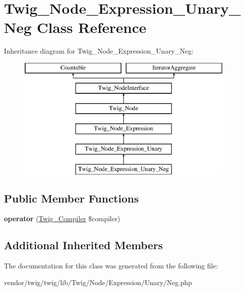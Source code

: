 \hypertarget{classTwig__Node__Expression__Unary__Neg}{}\section{Twig\+\_\+\+Node\+\_\+\+Expression\+\_\+\+Unary\+\_\+\+Neg Class Reference}
\label{classTwig__Node__Expression__Unary__Neg}
Inheritance diagram for Twig\+\_\+\+Node\+\_\+\+Expression\+\_\+\+Unary\+\_\+\+Neg\+:\begin{figure}[H]
\begin{center}
\leavevmode
\includegraphics[height=6.000000cm]{classTwig__Node__Expression__Unary__Neg}
\end{center}
\end{figure}
\subsection*{Public Member Functions}
\begin{DoxyCompactItemize}
\item 
{\bfseries operator} (\hyperlink{classTwig__Compiler}{Twig\+\_\+\+Compiler} \$compiler)\hypertarget{classTwig__Node__Expression__Unary__Neg_abf234515b049d5c6553ff7247bea40ab}{}\label{classTwig__Node__Expression__Unary__Neg_abf234515b049d5c6553ff7247bea40ab}

\end{DoxyCompactItemize}
\subsection*{Additional Inherited Members}


The documentation for this class was generated from the following file\+:\begin{DoxyCompactItemize}
\item 
vendor/twig/twig/lib/\+Twig/\+Node/\+Expression/\+Unary/Neg.\+php\end{DoxyCompactItemize}
